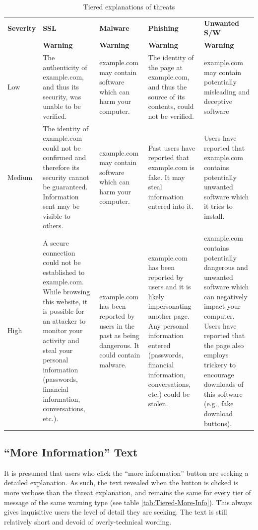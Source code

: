{\renewcommand{\arraystretch}{1.2}
\begin{table}[!htb]
	\small
	\centering
	\begin{tabularx}{\textwidth}{|l|X|X|X|X|}
		\hline
		\textbf{Severity} & \textbf{SSL} & \textbf{Malware} & \textbf{Phishing} & \textbf{Unwanted S/W}\\
		& \textbf{Warning} & \textbf{Warning} & \textbf{Warning} & \textbf{Warning}\\
		\hline
		Low
		& The authenticity of example.com, and thus its security, was unable to be verified.
		& example.com may contain software which can harm your computer.
		& The identity of the page at example.com, and thus the source of its contents, could not be verified.
		& example.com may contain potentially misleading and deceptive software\\
		\hline
		Medium
		& The identity of example.com could not be confirmed and therefore its security cannot be guaranteed. Information sent may be visible to others.
		& example.com may contain software which can harm your computer.
		& Past users have reported that example.com is fake. It may steal information entered into it.
		& Users have reported that example.com contains potentially unwanted software which it tries to install.\\
		\hline
		High
		& A secure connection could not be established to example.com. While browsing this website, it is possible for an attacker to monitor your activity and steal your personal information (passwords, financial information, conversations, etc.).
		& example.com has been reported by users in the past as being dangerous. It could contain malware.
		& example.com has been reported by users and it is likely impersonating another page. Any personal information entered (passwords, financial information, conversations, etc.) could be stolen.
		& example.com contains potentially dangerous and unwanted software which can negatively impact your computer. Users have reported that the page also employs trickery to encourage downloads of this software (e.g., fake download buttons).\\
		\hline
	\end{tabularx}
	\caption{Tiered explanations of threats}
	\label{tab:Tiered-Body}
\end{table}}

\subsection{``More Information'' Text}
It is presumed that users who click the ``more information'' button are seeking a detailed explanation. As such, the text revealed when the button is clicked is more verbose than the threat explanation, and remains the same for every tier of message of the same warning type (see table \ref{tab:Tiered-More-Info}). This always gives inquisitive users the level of detail they are seeking. The text is still relatively short and devoid of overly-technical wording.

